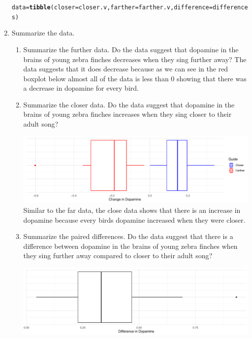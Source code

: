 \documentclass{article}\usepackage[]{graphicx}\usepackage[]{xcolor}
\makeatletter
\def\maxwidth{ %
  \ifdim\Gin@nat@width>\linewidth
    \linewidth
  \else
    \Gin@nat@width
  \fi
}
\newcommand{\hldef}[1]{\textcolor[rgb]{0.345,0.345,0.345}{#1}}%
\newcommand{\hlkwb}[1]{\textcolor[rgb]{0.69,0.353,0.396}{#1}}%
\newcommand{\hlkwc}[1]{\textcolor[rgb]{0.333,0.667,0.333}{#1}}%
\newcommand{\hlkwd}[1]{\textcolor[rgb]{0.737,0.353,0.396}{\textbf{#1}}}%
\newenvironment{kframe}{%
 \def\at@end@of@kframe{}%
 \ifinner\ifhmode%
  \def\at@end@of@kframe{\end{minipage}}%
  \begin{minipage}{\columnwidth}%
 \fi\fi%
 \def\FrameCommand##1{\hskip\@totalleftmargin \hskip-\fboxsep
 \colorbox{shadecolor}{##1}\hskip-\fboxsep
     \hskip-\linewidth \hskip-\@totalleftmargin \hskip\columnwidth}%
 \MakeFramed {\advance\hsize-\width
   \@totalleftmargin\z@ \linewidth\hsize
   \@setminipage}}%
 {\par\unskip\endMakeFramed%
 \at@end@of@kframe}
\newenvironment{knitrout}{}{} %
\makeatother
\begin{document}
\begin{enumerate}
\begin{knitrout}
\begin{kframe}
\begin{alltt}
\hldef{data} \hlkwb{=} \hlkwd{tibble}\hldef{(}\hlkwc{closer} \hldef{= closer.v,} \hlkwc{farther} \hldef{= farther.v,} \hlkwc{difference} \hldef{= differences)}
\end{alltt}
\end{kframe}
\end{knitrout}
\item Summarize the data.
\begin{enumerate}
  \item Summarize the further data. Do the data suggest that
   dopamine in the brains of young zebra finches decreases when
   they sing further away?
   The data suggests that it does decrease because as we can see in the red boxplot below almost all of the data is less than 0 showing that there was a decrease in dopamine for every bird.
   \item Summarize the closer data. Do the data suggest that
   dopamine in the brains of young zebra finches increases when
   they sing closer to their adult song?
   \begin{center}
\begin{knitrout}
\color{fgcolor}
\includegraphics[width=\maxwidth]{figure/unnamed-chunk-4-1} 
\end{knitrout}
Similar to the far data, the close data shows that there is an increase in dopamine because every birds dopamine increased when they were closer. 
\end{center}
  \item Summarize the paired differences. Do the data suggest
  that there is a difference between dopamine in the brains of
  young zebra finches when they sing further away compared to 
  closer to their adult song?
  \begin{center}
\begin{knitrout}
\color{fgcolor}
\includegraphics[width=\maxwidth]{figure/unnamed-chunk-5-1} 

\end{knitrout}
\end{center}
\end{enumerate}
\end{enumerate}
\end{document}
